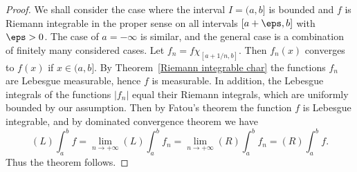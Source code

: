 \begin{proof}
We shall consider the case where the interval $I=(a,b]$ is bounded and $f$ is Riemann integrable in the proper sense on all intervals $[a+\eps,b]$ with $\eps>0$. The case of $a=-\infty$ is similar, and the general case is a combination of finitely many considered cases. Let $f_n=f\chi_{[a+1/n,b]}$. Then $f_n(x)$ converges to $f(x)$ if $x\in(a,b]$. By Theorem~\ref{Riemann integrable char} the functions $f_n$ are Lebesgue measurable, hence $f$ is measurable. In addition, the Lebesgue integrals of the functions $|f_n|$ equal their Riemann integrals, which are uniformly bounded by our assumption. Then by Fatou's theorem the function $f$ is Lebesgue integrable, and by dominated convergence theorem we have
\[(L)\int_{a}^{b}f=\lim_{n\to+\infty}(L)\int_{a}^{b}f_n=\lim_{n\to+\infty}(R)\int_{a}^{b}f_n=(R)\int_{a}^{b}f.\]
Thus the theorem follows.
\end{proof}
